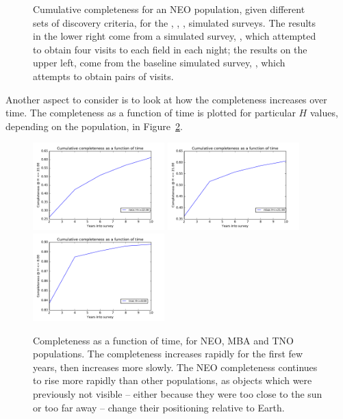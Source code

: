 \begin{figure}
\caption{Cumulative completeness for an NEO population, given
  different sets of discovery criteria, for the , ,
,
 simulated surveys. The results in the
lower right come from a simulated survey, ,
which attempted to obtain four visits to each field in each
night; the results on the upper left, come from the baseline simulated
survey, , which attempts to obtain pairs of
visits.
\label{completeness_changes}}
\end{figure}

Another aspect to consider is to look at how the completeness
increases over time. The completeness as a function of time is plotted
for particular $H$ values, depending on the
population, in Figure~\ref{completeness_time}. 

\begin{figure}
\includegraphics[width=2in]{figs/solarsystem/minion_1016_CompletenessOverTime_22_time}
\includegraphics[width=2in]{figs/solarsystem/minion_1016_CompletenessOverTime_21_time}
\includegraphics[width=2in]{figs/solarsystem/minion_1016_CompletenessOverTime_8_time}
\caption{Completeness as a function of time, for NEO, MBA and TNO
  populations. The completeness increases rapidly for the first few
  years, then increases more slowly. The NEO completeness continues to
  rise more rapidly than other populations, as objects which were
  previously not visible -- either because they were too close to the
  sun or too far away -- change their positioning relative to Earth.
\label{completeness_time}}
\end{figure}

